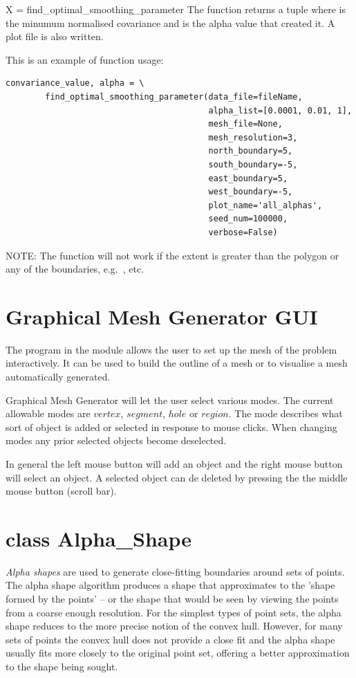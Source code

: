 \documentclass{manual}
\begin{document}
\begin{methoddesc}{X = find_optimal_smoothing_parameter}
The function returns a tuple  where  is
the minumum normalised covariance and  is the alpha value that 
created it.  A plot file is also written.

This is an example of function usage: \nopagebreak

\begin{verbatim}
convariance_value, alpha = \
        find_optimal_smoothing_parameter(data_file=fileName,
                                         alpha_list=[0.0001, 0.01, 1],
                                         mesh_file=None,
                                         mesh_resolution=3,
                                         north_boundary=5,
                                         south_boundary=-5,
                                         east_boundary=5,
                                         west_boundary=-5,
                                         plot_name='all_alphas',
                                         seed_num=100000,
                                         verbose=False)
\end{verbatim}

NOTE: The function will not work if the  extent is greater than the
\code{boundary_poly} polygon or any of the boundaries, e.g.\ \code{north_boundary}, etc.
\end{methoddesc}


\pagebreak
\section{Graphical Mesh Generator GUI}
The program  in the  module
allows the user to set up the mesh of the problem interactively.
It can be used to build the outline of a mesh or to visualise a mesh
automatically generated.

Graphical Mesh Generator will let the user select various modes. The
current allowable modes are $vertex$, $segment$, $hole$ or $region$.  The mode
describes what sort of object is added or selected in response to
mouse clicks.  When changing modes any prior selected objects become
deselected.

In general the left mouse button will add an object and the right
mouse button will select an object.  A selected object can de deleted
by pressing the the middle mouse button (scroll bar).


\pagebreak
\section{class Alpha_Shape}
\emph{Alpha shapes} are used to generate close-fitting boundaries
around sets of points. The alpha shape algorithm produces a shape
that approximates to the 'shape formed by the points' -- or the shape
that would be seen by viewing the points from a coarse enough
resolution. For the simplest types of point sets, the alpha shape
reduces to the more precise notion of the convex hull. However, for
many sets of points the convex hull does not provide a close fit and
the alpha shape usually fits more closely to the original point set,
offering a better approximation to the shape being sought.
\end{document}
